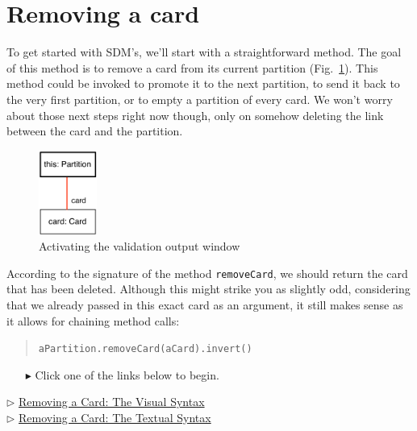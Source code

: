 \clearpage
\genHeader
\section{Removing a card}
\hypertarget{sec:remCard}{}

To get started with SDM's, we'll start with a straightforward method. The goal of this method is to remove a card from its current partition
(Fig.~\ref{fig:goal_removeCard}). This method could be invoked to promote it to the next partition, to send it back to the very first partition, or to empty a
partition of every card. We won't worry about those next steps right now though, only on somehow deleting the link between the card and the partition.

\begin{figure}[htbp]
	\centering
    \includegraphics[width=0.17\textwidth]{removeCard.pdf}
	\caption{Activating the validation output window}
	\label{fig:goal_removeCard}
\end{figure}
\FloatBarrier

According to the signature of the method \texttt{removeCard}, we should return the card that has been deleted. Although this might strike you as slightly odd,
considering that we already passed in this exact card as an argument, it still makes sense as it allows for chaining method calls:
\begin{quote}\texttt{aPartition.removeCard(aCard).invert()}\end{quote}


\vspace{0.5cm}
\begin{itemize}
\item[$\blacktriangleright$] Click one of the links below to begin. 
\end{itemize}

\begin{center} {$\triangleright$ \hyperlink{remCard vis}{Removing a Card: The Visual Syntax}}%
\\ \vspace{0.5cm}
{$\triangleright$ \hyperlink{remCard tex}{Removing a Card: The Textual Syntax} }\end{center}  




